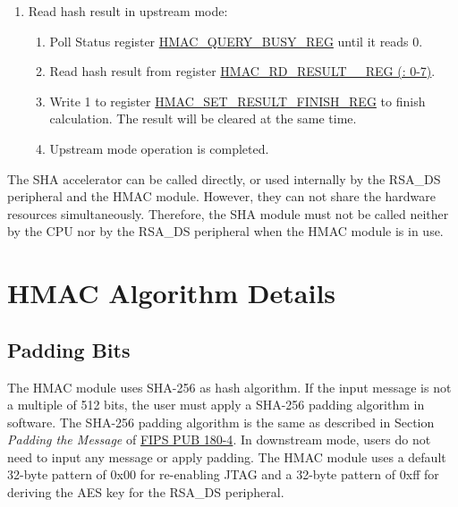 \documentclass[main\_\_EN.tex]{subfiles}
\begin{document}
\begin{enumerate}
    \item Read hash result in upstream mode:
    \begin{enumerate}
        \item Poll Status register \hyperref[regdesc:HMACQUERYBUSYREG]{HMAC\_QUERY\_BUSY\_REG} until it reads 0.
        \item Read hash result from register \hyperref[regdesc:HMACRDRESULTNREG]{HMAC\_RD\_RESULT\_\_REG (: 0-7)}.
        \item Write 1 to register \hyperref[regdesc:HMACSETRESULTFINISHREG]{HMAC\_SET\_RESULT\_FINISH\_REG} to finish calculation. The result will be cleared at the same time.
        \item Upstream mode operation is completed.
    \end{enumerate}
\end{enumerate}

\begin{tiplisting}
    The SHA accelerator can be called directly, or used internally by the RSA\_DS peripheral and the HMAC module. However, they can not share the hardware resources simultaneously. Therefore, the SHA module must not be called neither by the CPU nor by the RSA\_DS peripheral when the HMAC module is in use.
\end{tiplisting}

\section{HMAC Algorithm Details}

\subsection{Padding Bits}
\label{sec:hmac-padding}

The HMAC module uses SHA-256 as hash algorithm. If the input message is not a multiple of 512 bits, the user must apply a SHA-256 padding algorithm in software. The SHA-256 padding algorithm is the same as described in Section \textit{Padding the Message} of \href{https://nvlpubs.nist.gov/nistpubs/FIPS/NIST.FIPS.180-4.pdf}{FIPS PUB 180-4}. In downstream mode, users do not need to input any message or apply padding. The HMAC module uses a default 32-byte pattern of 0x00 for re-enabling JTAG and a 32-byte pattern of 0xff for deriving the AES key for the RSA\_DS peripheral.
\end{document}
